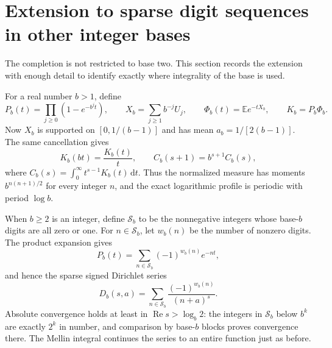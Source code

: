 \documentclass[11pt,a4paper]{article}
\numberwithin{equation}{section}
\theoremstyle{definition}
\theoremstyle{remark}
\newcommand{\E}{\mathbb E}
\newcommand{\dd}{\,\mathrm d}
\newcommand{\Rea}{\operatorname{Re}}
\begin{document}
\section{Extension to sparse digit sequences in other integer bases}
\label{sec:bases}
The completion is not restricted to base two. This section records
the extension with enough detail to identify exactly where
integrality of the base is used.

For a real number $b>1$, define
\begin{equation}
 P_b(t)=\prod_{j\ge0}(1-e^{-b^jt}),\qquad
 X_b=\sum_{j\ge1}b^{-j}U_j,\qquad
 \Phi_b(t)=\E e^{-tX_b},\qquad K_b=P_b\Phi_b.
 \label{eq:base-products}
\end{equation}
Now $X_b$ is supported on $[0,1/(b-1)]$ and has mean
$a_b=1/[2(b-1)]$. The same cancellation gives
\begin{equation}
 K_b(bt)=\frac{K_b(t)}t,
 \qquad C_b(s+1)=b^{s+1}C_b(s),
 \label{eq:base-mellin}
\end{equation}
where $C_b(s)=\int_0^\infty t^{s-1}K_b(t)\dd t$.
Thus the normalized measure has moments $b^{n(n+1)/2}$ for every
integer $n$, and the exact logarithmic profile is periodic with
period $\log b$.

When $b\ge2$ is an integer, define $\mathcal S_b$ to be the
nonnegative integers whose base-$b$ digits are all zero or one.
For $n\in\mathcal S_b$, let $w_b(n)$ be the number of nonzero
digits. The product expansion gives
\begin{equation}
 P_b(t)=\sum_{n\in\mathcal S_b}(-1)^{w_b(n)}e^{-nt},
 \label{eq:base-digit-series}
\end{equation}
and hence the sparse signed Dirichlet series
\begin{equation}
 D_b(s,a)=\sum_{n\in\mathcal S_b}
       \frac{(-1)^{w_b(n)}}{(n+a)^s}.
 \label{eq:base-Dirichlet}
\end{equation}
Absolute convergence holds at least in $\Rea s>\log_b2$:
the integers in $\mathcal S_b$ below $b^k$ are exactly $2^k$ in
number, and comparison by base-$b$ blocks proves convergence there.
The Mellin integral continues the series to an entire function just
as before.
\end{document}
